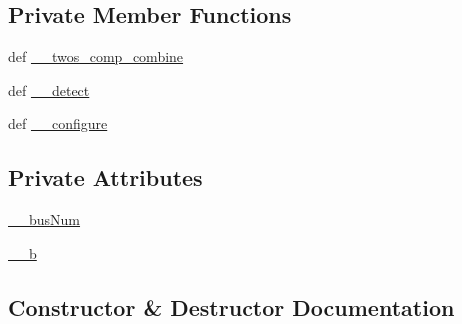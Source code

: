 \subsection*{Private Member Functions}
\begin{DoxyCompactItemize}
\item 
def \hyperlink{classlibsensorPy_1_1concretesensor_1_1lsm303dAccelerometer_1_1LSM303DAccelerometer_ad08c63e72ae4216ed219ffa7567e237b}{\+\_\+\+\_\+twos\+\_\+comp\+\_\+combine}
\item 
def \hyperlink{classlibsensorPy_1_1concretesensor_1_1lsm303dAccelerometer_1_1LSM303DAccelerometer_a3011da9fa0cc8c50f37337cf6fee6d2f}{\+\_\+\+\_\+detect}
\item 
def \hyperlink{classlibsensorPy_1_1concretesensor_1_1lsm303dAccelerometer_1_1LSM303DAccelerometer_a9612e64c287f6907951fcbe35a6370c3}{\+\_\+\+\_\+configure}
\end{DoxyCompactItemize}
\subsection*{Private Attributes}
\begin{DoxyCompactItemize}
\item 
\hyperlink{classlibsensorPy_1_1concretesensor_1_1lsm303dAccelerometer_1_1LSM303DAccelerometer_a2c85638e9a174d5e835d5f5c829d4157}{\+\_\+\+\_\+bus\+Num}
\item 
\hyperlink{classlibsensorPy_1_1concretesensor_1_1lsm303dAccelerometer_1_1LSM303DAccelerometer_a22bd0442c2ddb66cc6b3829aa073717c}{\+\_\+\+\_\+b}
\end{DoxyCompactItemize}


\subsection{Constructor \& Destructor Documentation}
\hypertarget{classlibsensorPy_1_1concretesensor_1_1lsm303dAccelerometer_1_1LSM303DAccelerometer_a13fb3cce8f47604a9eda55c52dd89f3e}{}

